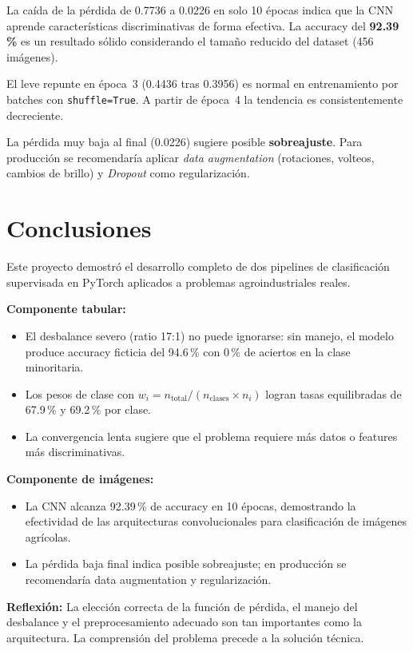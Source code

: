 \documentclass[12pt,a4paper]{article}
\begin{document}
La caída de la pérdida de 0.7736 a 0.0226 en solo 10 épocas indica que la CNN
aprende características discriminativas de forma efectiva. La accuracy del
\textbf{92.39\,\%} es un resultado sólido considerando el tamaño reducido del
dataset (456 imágenes).

El leve repunte en época~3 (0.4436 tras 0.3956) es normal en entrenamiento
por batches con \texttt{shuffle=True}. A partir de época~4 la tendencia es
consistentemente decreciente.

La pérdida muy baja al final (0.0226) sugiere posible \textbf{sobreajuste}.
Para producción se recomendaría aplicar \textit{data augmentation} (rotaciones,
volteos, cambios de brillo) y \textit{Dropout} como regularización.

\section{Conclusiones}

Este proyecto demostró el desarrollo completo de dos pipelines de clasificación
supervisada en PyTorch aplicados a problemas agroindustriales reales.

\textbf{Componente tabular:}
\begin{itemize}
  \item El desbalance severo (ratio 17:1) no puede ignorarse: sin manejo, el
        modelo produce accuracy ficticia del 94.6\,\% con 0\,\% de aciertos
        en la clase minoritaria.
  \item Los pesos de clase con $w_i = n_{\text{total}}/(n_{\text{clases}} \times n_i)$
        logran tasas equilibradas de 67.9\,\% y 69.2\,\% por clase.
  \item La convergencia lenta sugiere que el problema requiere más datos o
        features más discriminativas.
\end{itemize}

\textbf{Componente de imágenes:}
\begin{itemize}
  \item La CNN alcanza 92.39\,\% de accuracy en 10 épocas, demostrando la
        efectividad de las arquitecturas convolucionales para clasificación
        de imágenes agrícolas.
  \item La pérdida baja final indica posible sobreajuste; en producción se
        recomendaría data augmentation y regularización.
\end{itemize}

\textbf{Reflexión:} La elección correcta de la función de pérdida, el manejo
del desbalance y el preprocesamiento adecuado son tan importantes como la
arquitectura. La comprensión del problema precede a la solución técnica.
\end{document}
